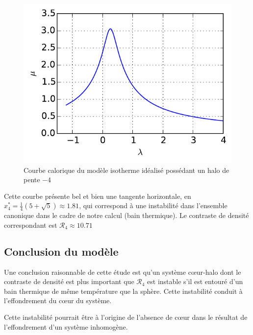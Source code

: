 	\begin{figure}
		\centering \includegraphics{theorie/graphe/alpha_4.pdf}
		\caption{Courbe calorique du modèle isotherme idéalisé possédant un halo de pente $-4$ \label{fig::DET}}
	\end{figure}

	Cette courbe présente bel et bien une tangente horizontale, en $x^*_4= \frac{1}{4} \left(5+\sqrt{5}\right) \approx 1.81$, qui correspond à une
	instabilité dans l'ensemble canonique dans le cadre de notre calcul (bain thermique). Le contraste de densité correspondant est
	$\mathcal{R}_4\approx 10.71$

\subsection{Conclusion du modèle}

	Une conclusion raisonnable de cette étude est qu'un système cœur-halo dont le contraste de densité est plus important que $\mathcal{R}_4$ est
	instable s'il est entouré d'un bain thermique de même température que la sphère. Cette instabilité conduit à l'effondrement du cœur du
	système.

	Cette instabilité pourrait être à l'origine de l'absence de cœur dans le résultat de l'effondrement d'un système inhomogène.

